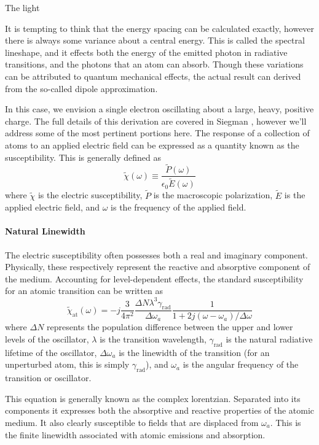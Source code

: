 The light 

It is tempting to think that the energy spacing can be calculated exactly,
however there is always some variance about a central energy. This is called the
spectral lineshape, and it effects both the energy of the emitted photon in
radiative transitions, and the photons that an atom can absorb. Though these
variations can be attributed to quantum mechanical effects, the actual result
can derived from the so-called dipole approximation.

In this case, we envision a single electron oscillating about a large, heavy,
positive charge. The full details of this derivation are covered in Siegman
\cite{Siegman1986}, however we'll address some of the most pertinent portions
here. The response of a collection of atoms to an applied electric field can be
expressed as a quantity known as the susceptibility. This is generally defined
as
\begin{equation}
    \tilde{\chi}(\omega) \equiv
    \frac{\tilde{P}(\omega)}{\epsilon_0\tilde{E}(\omega)}
\end{equation}
where $\tilde{\chi}$ is the electric susceptibility, $\tilde{P}$ is the
macroscopic polarization, $\tilde{E}$ is the applied electric field, and
$\omega$ is the frequency of the applied field.

\paragraph{Natural Linewidth}
The electric susceptibility often possesses both a real and imaginary component.
Physically, these respectively represent the reactive and absorptive component
of the medium. Accounting for level-dependent effects, the standard
susceptibility for an atomic transition can be written as
\begin{equation}
    \tilde{\chi}_\mathrm{at}(\omega) = -j\frac{3}{4\pi^2}\frac{\Delta
    N\lambda^3\gamma_\mathrm{rad}}{\Delta\omega_a}\frac{1}{1
    + 2j(\omega - \omega_a)/\Delta\omega}
\end{equation}
where $\Delta N$ represents the population difference between the upper and
lower levels of the oscillator, $\lambda$ is the transition wavelength,
$\gamma_\mathrm{rad}$ is the natural radiative lifetime of the oscillator,
$\Delta\omega_a$ is the linewidth of the transition (for an unperturbed
atom, this is simply $\gamma_\mathrm{rad}$), and $\omega_a$ is the
angular frequency of the transition or oscillator.

This equation is generally known as the complex lorentzian. Separated into its
components it expresses both the absorptive and reactive properties of the
atomic medium. It also clearly susceptible to fields that are displaced from
$\omega_a$. This is the finite linewidth associated with atomic
emissions and absorption.

